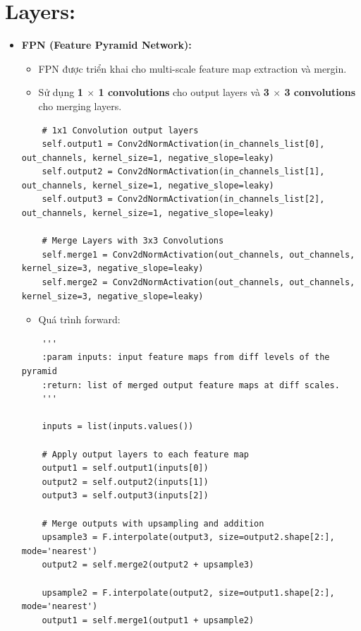 \documentclass[12pt, a4paper, oneside]{book}
\theoremstyle{plain}
\numberwithin{equation}{chapter} \DeclareMathOperator{\Var}{var}
\begin{document}
\section{Layers:}
\begin{itemize}
    \item[--] \textbf{FPN (Feature Pyramid Network):}
    \begin{itemize}
        \item [+] FPN được triển khai cho multi-scale feature map extraction và mergin.
        \item [+] Sử dụng \textbf{1 \(\times\) 1 convolutions} cho output layers và \textbf{3 \(\times\) 3 convolutions} cho merging layers.
    \end{itemize}
    \begin{lstlisting}
    # 1x1 Convolution output layers
    self.output1 = Conv2dNormActivation(in_channels_list[0], out_channels, kernel_size=1, negative_slope=leaky)
    self.output2 = Conv2dNormActivation(in_channels_list[1], out_channels, kernel_size=1, negative_slope=leaky)
    self.output3 = Conv2dNormActivation(in_channels_list[2], out_channels, kernel_size=1, negative_slope=leaky)

    # Merge Layers with 3x3 Convolutions
    self.merge1 = Conv2dNormActivation(out_channels, out_channels, kernel_size=3, negative_slope=leaky)
    self.merge2 = Conv2dNormActivation(out_channels, out_channels, kernel_size=3, negative_slope=leaky)
    \end{lstlisting}
    \newpage
    \begin{itemize}
        \item[+] Quá trình forward:
    \end{itemize}
    \begin{lstlisting}
    '''
    :param inputs: input feature maps from diff levels of the pyramid
    :return: list of merged output feature maps at diff scales.
    '''

    inputs = list(inputs.values())

    # Apply output layers to each feature map
    output1 = self.output1(inputs[0])
    output2 = self.output2(inputs[1])
    output3 = self.output3(inputs[2])

    # Merge outputs with upsampling and addition
    upsample3 = F.interpolate(output3, size=output2.shape[2:], mode='nearest')
    output2 = self.merge2(output2 + upsample3)

    upsample2 = F.interpolate(output2, size=output1.shape[2:], mode='nearest')
    output1 = self.merge1(output1 + upsample2)


\end{lstlisting}
\end{itemize}
\end{document}
